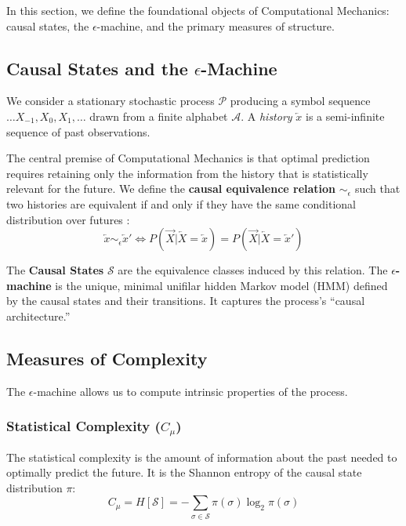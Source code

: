 In this section, we define the foundational objects of Computational Mechanics: causal states, the $\epsilon$-machine, and the primary measures of structure.

\subsection{Causal States and the $\epsilon$-Machine}
We consider a stationary stochastic process $\mathcal{P}$ producing a symbol sequence $\dots X_{-1}, X_0, X_1, \dots$ drawn from a finite alphabet $\mathcal{A}$. A \textit{history} $\overleftarrow{x}$ is a semi-infinite sequence of past observations.

The central premise of Computational Mechanics is that optimal prediction requires retaining only the information from the history that is statistically relevant for the future. We define the \textbf{causal equivalence relation} $\sim_{\epsilon}$ such that two histories are equivalent if and only if they have the same conditional distribution over futures \cite{shalizi2000computational}:
\begin{equation}
    \overleftarrow{x} \sim_{\epsilon} \overleftarrow{x}' \iff P(\vec{X} | \overleftarrow{X} = \overleftarrow{x}) = P(\vec{X} | \overleftarrow{X} = \overleftarrow{x}')
\end{equation}

The \textbf{Causal States} $\mathcal{S}$ are the equivalence classes induced by this relation. The \textbf{$\epsilon$-machine} is the unique, minimal unifilar hidden Markov model (HMM) defined by the causal states and their transitions. It captures the process's ``causal architecture.''

\subsection{Measures of Complexity}
The $\epsilon$-machine allows us to compute intrinsic properties of the process.

\subsubsection{Statistical Complexity ($C_\mu$)}
The statistical complexity is the amount of information about the past needed to optimally predict the future. It is the Shannon entropy of the causal state distribution $\pi$:
\begin{equation}
    C_\mu = H[\mathcal{S}] = - \sum_{\sigma \in \mathcal{S}} \pi(\sigma) \log_2 \pi(\sigma)
\end{equation}


